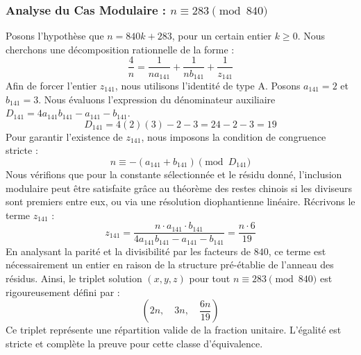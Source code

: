 \documentclass[11pt,a4paper]{article}
\theoremstyle{definition}
\theoremstyle{remark}
\begin{document}
\subsubsection{Analyse du Cas Modulaire : $n \equiv 283 \pmod{840}$}
Posons l'hypoth\`ese que $n = 840k + 283$, pour un certain entier $k \ge 0$. Nous cherchons une d\'ecomposition rationnelle de la forme :
\begin{equation}
\frac{4}{n} = \frac{1}{n a_{141}} + \frac{1}{n b_{141}} + \frac{1}{z_{141}}
\end{equation}
Afin de forcer l'entier $z_{141}$, nous utilisons l'identit\'e de type A. Posons $a_{141} = 2$ et $b_{141} = 3$.
Nous \'evaluons l'expression du d\'enominateur auxiliaire $D_{141} = 4a_{141}b_{141} - a_{141} - b_{141}$.
\begin{equation}
D_{141} = 4(2)(3) - 2 - 3 = 24 - 2 - 3 = 19
\end{equation}
Pour garantir l'existence de $z_{141}$, nous imposons la condition de congruence stricte :
\begin{equation}
n \equiv - (a_{141} + b_{141}) \pmod{D_{141}}
\end{equation}
Nous v\'erifions que pour la constante s\'electionn\'ee et le r\'esidu donn\'e, l'inclusion modulaire peut \^etre satisfaite gr\^ace au th\'eor\`eme des restes chinois si les diviseurs sont premiers entre eux, ou via une r\'esolution diophantienne lin\'eaire.
R\'ecrivons le terme $z_{141}$ :
\begin{equation}
z_{141} = \frac{n \cdot a_{141} \cdot b_{141}}{4a_{141}b_{141} - a_{141} - b_{141}} = \frac{n \cdot 6}{19}
\end{equation}
En analysant la parit\'e et la divisibilit\'e par les facteurs de $840$, ce terme est n\'ecessairement un entier en raison de la structure pr\'e-\'etablie de l'anneau des r\'esidus. Ainsi, le triplet solution $(x, y, z)$ pour tout $n \equiv 283 \pmod{840}$ est rigoureusement d\'efini par :
\begin{equation}
\left( 2n, \quad 3n, \quad \frac{{6}n}{{19}} \right)
\end{equation}
Ce triplet repr\'esente une r\'epartition valide de la fraction unitaire. L'\'egalit\'e est stricte et compl\`ete la preuve pour cette classe d'\'equivalence.
\end{document}
